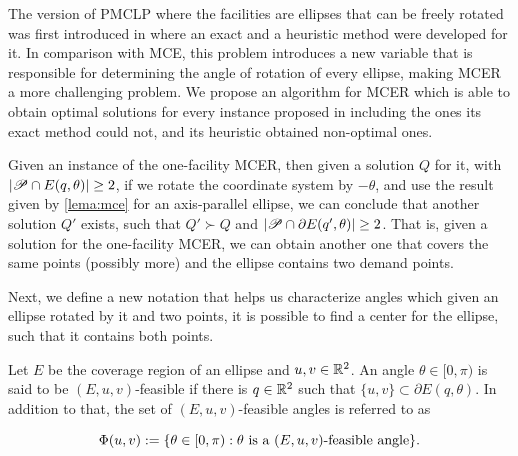The version of PMCLP where the facilities are ellipses that can be freely rotated was first introduced in \cite{andreta} where an exact and a heuristic method were developed for it. In comparison with MCE, this problem introduces a new variable that is responsible for determining the angle of rotation of every ellipse, making MCER a more challenging problem. We propose an algorithm for MCER which is able to obtain optimal solutions for every instance proposed in \cite{andreta} including the ones its exact method could not, and its heuristic obtained non-optimal ones.


Given an instance of the one-facility MCER, then given a solution $Q$ for it, with $|\mathscr{P} \cap E(q, \theta)| \ge 2$, if we rotate the coordinate system by $-\theta$, and use the result given by \autoref{lema:mce} for an axis-parallel ellipse, we can conclude that another solution $Q'$ exists, such that $Q' \succ Q$ and $|\mathscr{P} \cap \partial E(q', \theta)| \ge 2$. That is, given a solution for the one-facility MCER, we can obtain another one that covers the same points (possibly more) and the ellipse contains two demand points.

Next, we define a new notation that helps us characterize angles which given an ellipse rotated by it and two points, it is possible to find a center for the ellipse, such that it contains both points.

\begin{definition}\label{def:feasible_angle}
	Let $E$ be the coverage region of an ellipse and $u, v \in \mathbb{R}^2$. An angle $\theta \in [0, \pi)$ is said to be $(E, u, v)$-feasible if there is $q \in \mathbb{R}^2$ such that $\{u, v\} \subset \partial E(q, \theta)$.
	In addition to that, the set of $(E, u, v)$-feasible angles is referred to as 
	
	\begin{equation*}
	\Phi(u, v) := \{\theta \in [0, \pi) : \theta \textnormal{ is a } (E,u,v)\textnormal{-feasible angle}\}.
	\end{equation*}
\end{definition}

